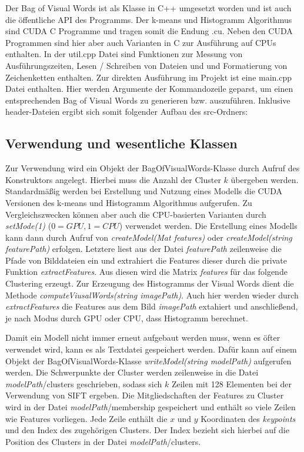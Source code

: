 Der Bag of Visual Words ist als Klasse in C++ umgesetzt worden und ist auch die öffentliche API des Programms. Der k-means und Histogramm Algorithmus sind CUDA C Programme und tragen somit die Endung .cu. Neben den CUDA Programmen sind hier aber auch Varianten in C zur Ausführung auf CPUs enthalten. In der util.cpp Datei sind Funktionen zur Messung von Ausführungszeiten, Lesen / Schreiben von Dateien und und Formatierung von Zeichenketten enthalten. Zur direkten Ausführung im Projekt ist eine main.cpp Datei enthalten. Hier werden Argumente der Kommandozeile geparst, um einen entsprechenden Bag of Visual Words zu generieren bzw. auszuführen. Inklusive header-Dateien ergibt sich somit folgender Aufbau des src-Ordners:

\subsection{Verwendung und wesentliche Klassen}

Zur Verwendung wird ein Objekt der BagOfVisualWords-Klasse durch Aufruf des Konstruktors angelegt. Hierbei muss die Anzahl der Cluster $k$ übergeben werden. Standardmäßig werden bei Erstellung und Nutzung eines Modells die CUDA Versionen des k-means und Histogramm Algorithmus aufgerufen. Zu Vergleichszwecken können aber auch die CPU-basierten Varianten durch \textit{setMode(1)} ($0 = GPU, 1 = CPU$) verwendet werden. Die Erstellung eines Modells kann dann durch Aufruf von \textit{createModel(Mat features)} oder \textit{createModel(string featurePath)} erfolgen. Letztere liest aus der Datei \textit{featurePath} zeilenweise die Pfade von Bilddateien ein und extrahiert die Features dieser durch die private Funktion \textit{extractFeatures}. Aus diesen wird die Matrix \textit{features} für das folgende Clustering erzeugt.
Zur Erzeugung des Histogramms der Visual Words dient die Methode \textit{computeViusalWords(string imagePath)}. Auch hier werden wieder durch \textit{extractFeatures} die Features aus dem Bild \textit{imagePath} extahiert und anschließend, je nach Modus durch GPU oder CPU, dass Histogramm berechnet. 

 Damit ein Modell nicht immer erneut aufgebaut werden muss, wenn es öfter verwendet wird, kann es als Textdatei gespeichert werden. Dafür kann auf einem Objekt der BagOfVisualWords-Klasse \textit{writeModel(string modelPath)} aufgerufen werden. Die Schwerpunkte der Cluster werden zeilenweise in die Datei \textit{modelPath}/clusters geschrieben, sodass sich $k$ Zeilen mit 128 Elementen bei der Verwendung von SIFT ergeben. Die Mitgliedschaften der Features zu Cluster wird in der Datei \textit{modelPath}/membership gespeichert und enthält so viele Zeilen wie Features vorliegen. Jede Zeile enthält die $x$ und $y$ Koordinaten des \textit{keypoints} und den Index des zugehörigen Clusters. Der Index bezieht sich hierbei auf die Position des Clusters in der Datei \textit{modelPath}/clusters.

